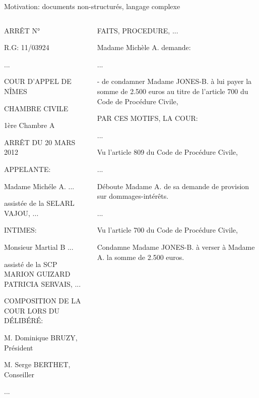 \documentclass[newPxFont,pagenumber]{beamer}
\begin{document}
\begin{frame}{Motivation: documents non-structurés, langage complexe}
\scriptsize
\begin{columns}
\begin{column}{.50\linewidth}
ARRÊT N°

R.G: 11/03924

...

{COUR D'APPEL} DE {NÎMES}

{CHAMBRE CIVILE}

{1ère Chambre A}

ARRÊT DU {20 MARS 2012}

APPELANTE:

{Madame Michéle A.} ...

assistée de la {SELARL VAJOU}, ...

INTIMES:

{Monsieur Martial B} ...

assisté de la {SCP MARION GUIZARD PATRICIA SERVAIS}, ...

COMPOSITION DE LA COUR LORS DU DÉLIBÉRÉ:

{M. Dominique BRUZY, Président}

{M. Serge BERTHET, Conseiller}

...
\end{column}
\begin{column}{.50\linewidth}
FAITS, PROCEDURE, ...

Madame Michèle A. demande:

...

- de condamner Madame JONES-B. à lui payer la somme de {2.500 euros} au titre de l'{article 700 du Code de Procédure Civile}, 

\vspace{0.4cm}

PAR CES MOTIFS, LA COUR:

...

Vu l'{article 809 du Code de Procédure Civile},

...

{Déboute Madame A. de sa demande de provision sur dommages-intérêts.}

...

Vu l'{article 700 du Code de Procédure Civile},

Condamne Madame JONES-B. à verser à Madame A. la somme de {2.500 euros}.
\end{column}
\end{columns}
\end{frame}
\end{document}
